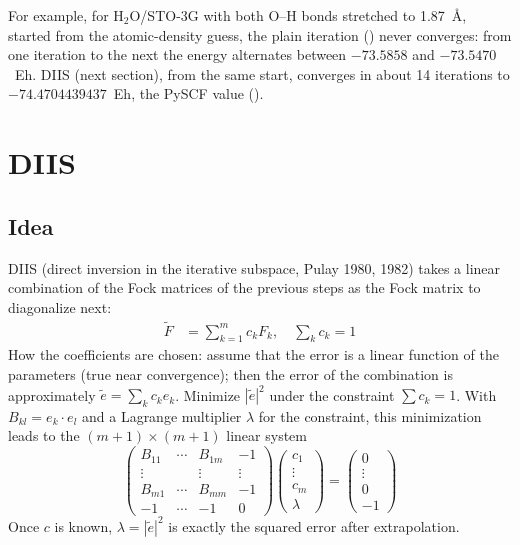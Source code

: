 For example, for H$_2$O/STO-3G with both O--H bonds stretched to 1.87~Å, started from the atomic-density guess, the plain iteration () never converges: from one iteration to the next the energy alternates between $-73.5858$ and $-73.5470$~Eh. DIIS (next section), from the same start, converges in about 14 iterations to $-74.4704439437$~Eh, the PySCF value ().

\section{DIIS}

\subsection{Idea}

DIIS (direct inversion in the iterative subspace, Pulay 1980, 1982) takes a linear combination of the Fock matrices of the previous steps as the Fock matrix to diagonalize next:
\begin{align*}
\tilde{F} &= \sum_{k=1}^m c_k F_k, \quad \sum_k c_k = 1
\end{align*}
How the coefficients are chosen: assume that the error is a linear function of the parameters (true near convergence); then the error of the combination is approximately $\tilde{e} = \sum_k c_k e_k$. Minimize $|\tilde{e}|^2$ under the constraint $\sum c_k = 1$. With $B_{kl} = e_k \cdot e_l$ and a Lagrange multiplier $\lambda$ for the constraint, this minimization leads to the $(m+1) \times (m+1)$ linear system
\[
\begin{pmatrix} B_{11} & \cdots & B_{1m} & -1\\ \vdots & & \vdots & \vdots\\ B_{m1} & \cdots & B_{mm} & -1\\ -1 & \cdots & -1 & 0 \end{pmatrix}
\begin{pmatrix} c_1\\ \vdots\\ c_m\\ \lambda \end{pmatrix}
= \begin{pmatrix} 0\\ \vdots\\ 0\\ -1 \end{pmatrix}
\]
Once $c$ is known, $\lambda = |\tilde{e}|^2$ is exactly the squared error after extrapolation.

